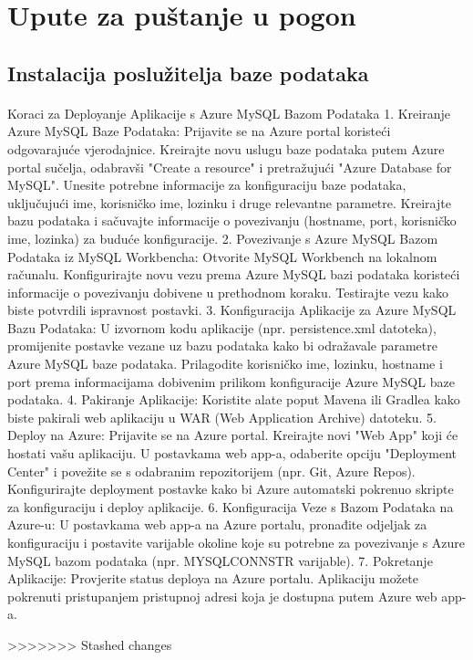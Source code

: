 \section{Upute za puštanje u pogon}

\subsection{Instalacija poslužitelja baze podataka}

\paragraph{}{
	Koraci za Deployanje Aplikacije s Azure MySQL Bazom Podataka
	1. Kreiranje Azure MySQL Baze Podataka:
	Prijavite se na Azure portal koristeći odgovarajuće vjerodajnice.
	Kreirajte novu uslugu baze podataka putem Azure portal sučelja, odabravši "Create a resource" i pretražujući "Azure Database for MySQL".
	Unesite potrebne informacije za konfiguraciju baze podataka, uključujući ime, korisničko ime, lozinku i druge relevantne parametre.
	Kreirajte bazu podataka i sačuvajte informacije o povezivanju (hostname, port, korisničko ime, lozinka) za buduće konfiguracije.
	2. Povezivanje s Azure MySQL Bazom Podataka iz MySQL Workbencha:
	Otvorite MySQL Workbench na lokalnom računalu.
	Konfigurirajte novu vezu prema Azure MySQL bazi podataka koristeći informacije o povezivanju dobivene u prethodnom koraku.
	Testirajte vezu kako biste potvrdili ispravnost postavki.
	3. Konfiguracija Aplikacije za Azure MySQL Bazu Podataka:
	U izvornom kodu aplikacije (npr. persistence.xml datoteka), promijenite postavke vezane uz bazu podataka kako bi odražavale parametre Azure MySQL baze podataka.
	Prilagodite korisničko ime, lozinku, hostname i port prema informacijama dobivenim prilikom konfiguracije Azure MySQL baze podataka.
	4. Pakiranje Aplikacije:
	Koristite alate poput Mavena ili Gradlea kako biste pakirali web aplikaciju u WAR (Web Application Archive) datoteku.
	5. Deploy na Azure:
	Prijavite se na Azure portal.
	Kreirajte novi "Web App" koji će hostati vašu aplikaciju.
	U postavkama web app-a, odaberite opciju "Deployment Center" i povežite se s odabranim repozitorijem (npr. Git, Azure Repos).
	Konfigurirajte deployment postavke kako bi Azure automatski pokrenuo skripte za konfiguraciju i deploy aplikacije.
	6. Konfiguracija Veze s Bazom Podataka na Azure-u:
	U postavkama web app-a na Azure portalu, pronađite odjeljak za konfiguraciju i postavite varijable okoline koje su potrebne za povezivanje s Azure MySQL bazom podataka (npr. MYSQLCONNSTR varijable).
	7. Pokretanje Aplikacije:
	Provjerite status deploya na Azure portalu.
	Aplikaciju možete pokrenuti pristupanjem pristupnoj adresi koja je dostupna putem Azure web app-a.
}




\eject
>>>>>>> Stashed changes
